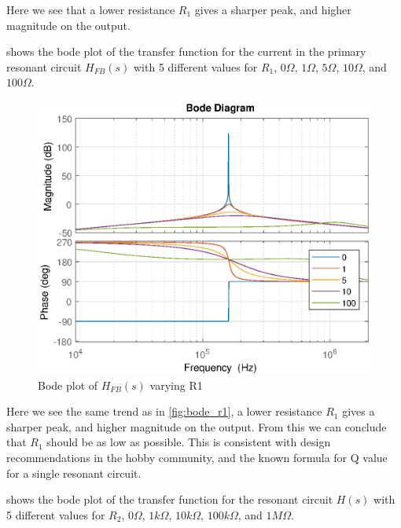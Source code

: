 Here we see that a lower resistance $R_1$ gives a sharper peak, and higher magnitude on the output.

\newpage
{} shows the bode plot of the transfer function for the current in the primary resonant circuit $H_{FB}(s)$ with 5 different values for $R_1$, $0\Omega$, $1\Omega$, $5\Omega$, $10\Omega$, and $100\Omega$.
\begin{figure}[H]
    \centering
    \includegraphics[width=\textwidth]{img/FeedBackBode_R1.eps}
    \caption{Bode plot of $H_{FB}(s)$ varying R1}
    \label{fig:fbbode_r1}
\end{figure}

Here we see the same trend as in \cref{fig:bode_r1}, a lower resistance $R_1$ gives a sharper peak, and higher magnitude on the output. From this we can conclude that $R_1$ should be as low as possible. This is consistent with design recommendations in the hobby community, and the known formula for Q value for a single resonant circuit.

\newpage
{} shows the bode plot of the transfer function for the resonant circuit $H(s)$ with 5 different values for $R_2$, $0\Omega$, $1k\Omega$, $10k\Omega$, $100k\Omega$, and $1M\Omega$.

